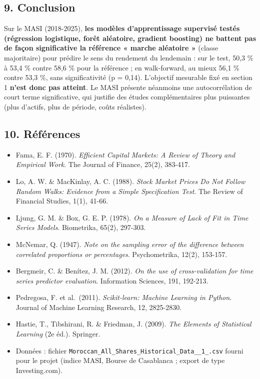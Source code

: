 \documentclass[
  10pt,
]{article}
\providecommand{\tightlist}{%
  \setlength{\itemsep}{0pt}\setlength{\parskip}{0pt}}
\begin{document}
\hypertarget{conclusion}{%
\subsection{9. Conclusion}\label{conclusion}}

Sur le MASI (2018-2025), \textbf{les modèles d'apprentissage supervisé
testés (régression logistique, forêt aléatoire, gradient boosting) ne
battent pas de façon significative la référence « marche aléatoire »}
(classe majoritaire) pour prédire le sens du rendement du lendemain :
sur le test, 50,3 \% à 53,4 \% contre 58,6 \% pour la référence ; en
walk-forward, au mieux 56,1 \% contre 53,3 \%, sans significativité (p =
0,14). L'objectif mesurable fixé en section 1 \textbf{n'est donc pas
atteint}. Le MASI présente néanmoins une autocorrélation de court terme
significative, qui justifie des études complémentaires plus puissantes
(plus d'actifs, plus de période, coûts réalistes).

\hypertarget{ruxe9fuxe9rences}{%
\subsection{10. Références}\label{ruxe9fuxe9rences}}

\begin{itemize}
\tightlist
\item
  Fama, E. F. (1970). \emph{Efficient Capital Markets: A Review of
  Theory and Empirical Work}. The Journal of Finance, 25(2), 383-417.
\item
  Lo, A. W. \& MacKinlay, A. C. (1988). \emph{Stock Market Prices Do Not
  Follow Random Walks: Evidence from a Simple Specification Test}. The
  Review of Financial Studies, 1(1), 41-66.
\item
  Ljung, G. M. \& Box, G. E. P. (1978). \emph{On a Measure of Lack of
  Fit in Time Series Models}. Biometrika, 65(2), 297-303.
\item
  McNemar, Q. (1947). \emph{Note on the sampling error of the difference
  between correlated proportions or percentages}. Psychometrika, 12(2),
  153-157.
\item
  Bergmeir, C. \& Benítez, J. M. (2012). \emph{On the use of
  cross-validation for time series predictor evaluation}. Information
  Sciences, 191, 192-213.
\item
  Pedregosa, F. et al.~(2011). \emph{Scikit-learn: Machine Learning in
  Python}. Journal of Machine Learning Research, 12, 2825-2830.
\item
  Hastie, T., Tibshirani, R. \& Friedman, J. (2009). \emph{The Elements
  of Statistical Learning} (2e éd.). Springer.
\item
  Données : fichier
  \texttt{Moroccan\_All\_Shares\_Historical\_Data\_\_1\_.csv} fourni
  pour le projet (indice MASI, Bourse de Casablanca ; export de type
  Investing.com).
\end{itemize}
\end{document}
